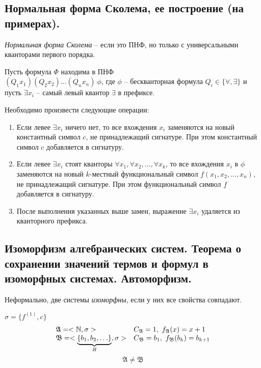 \subsection{Нормальная форма Сколема, ее построение (на примерах).}

\begin{definition}
    \emph{Нормальная форма Сколема} -- если это ПНФ, но только с универсальными кванторами первого порядка.
\end{definition}

\begin{note}[Сколемизация]
    Пусть формула $ \Phi $ находима в ПНФ \\$ (Q_1 x_1)(Q_2x_2)\ldots(Q_nx_n) \ \phi $, где $ \phi $ -- бескванторная формула $ Q_i \in \{\forall,\exists\} $ и пусть $ \exists x_i $ -- самый левый квантор $ \exists $ в префиксе.

    Необходимо произвести следующие операции:
    \begin{enumerate}
        \item Если левее $ \exists x_i $ ничего нет, то все вхождения $ x_i $ заменяются на новый константный символ $ c $, не принадлежащий сигнатуре. При этом константный символ $ c $ добавляется в сигнатуру.
        \item Если левее $ \exists x_i $ стоят кванторы $ \forall x_1, \forall x_2, \ldots, \forall x_k $, то все вхождения $ x_i $ в $ \phi $ заменяются на новый $ k $-местный функциональный символ $ f(x_1,x_2,\ldots,x_n) $, не принадлежащий сигнатуре. При этом функциональный символ $ f $ добавляется в сигнатуру.
        \item После выполнения указанных выше замен, выражение $ \exists x_i $ удаляется из кванторного префикса.
    \end{enumerate}
\end{note}

\subsection{Изоморфизм алгебраических систем. Теорема о сохранении значений термов и формул в изоморфных системах. Автоморфизм.}

\begin{note}
    Неформально, две системы \emph{изоморфны}, если у них все свойства совпадают.
\end{note}

\begin{example}
    $ \sigma = \{f^{(1)},c\} $
    \[
        \begin{array}{ll}
            \mathfrak{A} = <\mathbb{N},\sigma>                                  & C_\mathfrak{A} = 1, \ f_\mathfrak{A}(x) = x+1         \\
            \mathfrak{B} = <\underbrace{\{b_1,b_2,\ldots\}}_{B},\sigma> & C_\mathfrak{B} = b_1, \ f_\mathfrak{B}(b_k) = b_{k+1}
        \end{array}
    \]
    \[
        \mathfrak{A}\ne\mathfrak{B}
    \]
\end{example}

